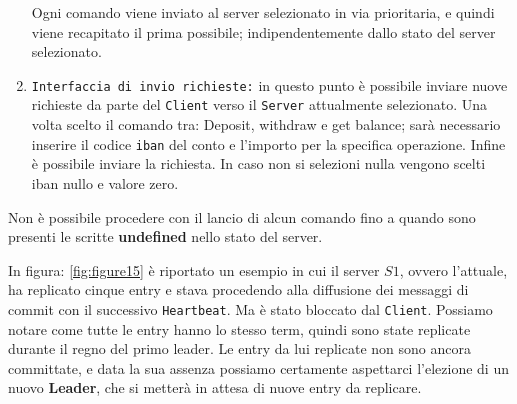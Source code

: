 \begin{enumerate}
\begin{itemize}
		\end{itemize}
		Ogni comando viene inviato al server selezionato in via prioritaria, e quindi viene recapitato il prima possibile; indipendentemente dallo stato del server selezionato. 
	\item \texttt{Interfaccia di invio richieste:}
		in questo punto è possibile inviare nuove richieste da parte del \texttt{Client} verso il \texttt{Server} attualmente selezionato.
		Una volta scelto il comando tra: Deposit, withdraw e get balance; sarà necessario inserire il codice \texttt{iban} del conto e l'importo per la specifica operazione.
		Infine è possibile inviare la richiesta. In caso non si selezioni nulla vengono scelti iban nullo e valore zero.	
\end{enumerate}
Non è possibile procedere con il lancio di alcun comando fino a quando sono presenti le scritte \textbf{undefined} nello stato del server.

In figura: \ref{fig:figure15} è riportato un esempio in cui il server \textbf{$S1$}, ovvero l'attuale, ha replicato cinque entry e stava procedendo alla diffusione dei messaggi di commit con il successivo \texttt{Heartbeat}. Ma è stato bloccato dal \texttt{Client}.
Possiamo notare come tutte le entry hanno lo stesso term, quindi sono state replicate durante il regno del primo leader.
Le entry da lui replicate non sono ancora committate, e data la sua assenza possiamo certamente aspettarci l'elezione di un nuovo \textbf{Leader}, che si metterà in attesa di nuove entry da replicare.
